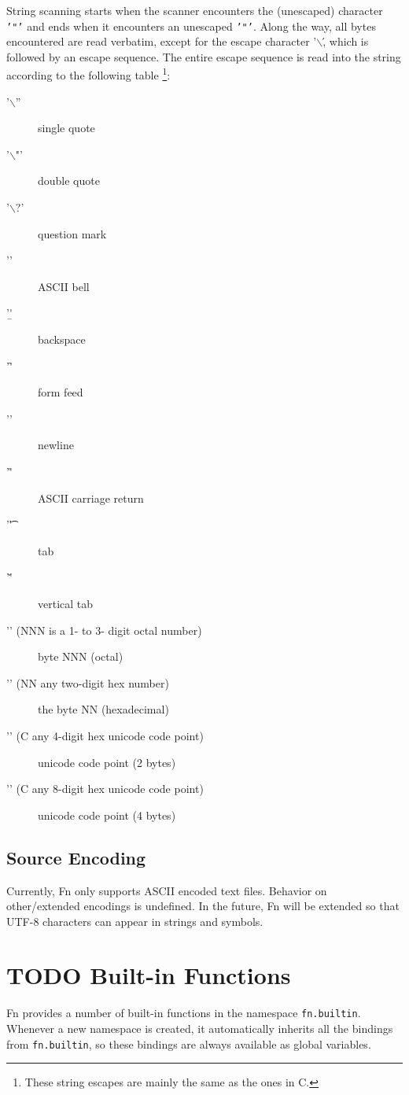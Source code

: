 \documentclass[11pt]{article}
\begin{document}
String scanning starts when the scanner encounters the (unescaped) character
\texttt{'"'} and ends when it encounters an unescaped \texttt{'"'}. Along the way, all bytes
encountered are read verbatim, except for the escape character '$\backslash$\', which is
followed by an escape sequence. The entire escape sequence is read into the
string according to the following table \footnote{These string escapes are mainly the same as the ones in C.}:
\begin{description}
\item[{'$\backslash$''}] single quote
\item[{'$\backslash$"'}] double quote
\item[{'$\backslash$?'}] question mark
\item[{'\a'}] ASCII bell
\item[{'\b'}] backspace
\item[{'\f'}] form feed
\item[{'\n'}] newline
\item[{'\r'}] ASCII carriage return
\item[{'\t'}] tab
\item[{'\v'}] vertical tab
\item[{'\NNN' (NNN is a 1- to 3- digit octal number)}] byte NNN (octal)
\item[{'\xNN' (NN any two-digit hex number)}] the byte NN (hexadecimal)
\item[{'\uC' (C any 4-digit hex unicode code point)}] unicode code point (2 bytes)
\item[{'\UC' (C any 8-digit hex unicode code point)}] unicode code point (4 bytes)
\end{description}

\subsection{Source Encoding}
\label{sec:org523c108}

Currently, Fn only supports ASCII encoded text files. Behavior on other/extended
encodings is undefined. In the future, Fn will be extended so that UTF-8
characters can appear in strings and symbols.


\section{{\bfseries\sffamily TODO} Built-in Functions}
\label{sec:org9c50f32}

Fn provides a number of built-in functions in the namespace \texttt{fn.builtin}.
Whenever a new namespace is created, it automatically inherits all the bindings
from \texttt{fn.builtin}, so these bindings are always available as global variables.
\end{document}
